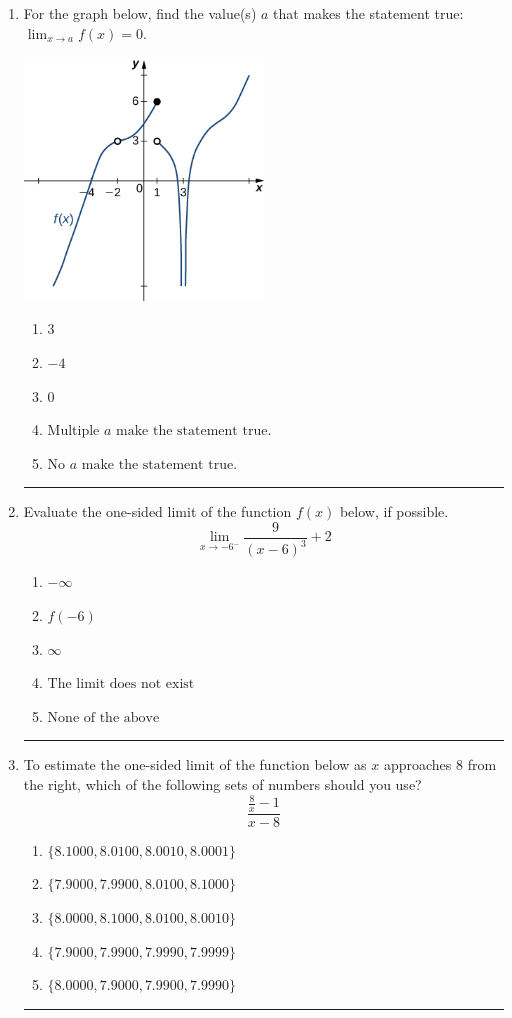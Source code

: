 \documentclass[14pt]{extbook}
\newcommand{\litem}[1]{\item#1\hspace*{-1cm}\rule{\textwidth}{0.4pt}}
\begin{document}
\begin{enumerate}
{\begin{enumerate}[label=\Alph*.]
\end{enumerate} }
\litem{
For the graph below, find the value(s) $a$ that makes the statement true: $ \displaystyle \lim_{x \rightarrow a} f(x) = 0$.
\begin{center}
    \includegraphics[width=0.5\textwidth]{../Figures/evaluateLimitGraphicallyA.png}
\end{center}
\begin{enumerate}[label=\Alph*.]
\item \( 3 \)
\item \( -4 \)
\item \( 0 \)
\item \( \text{Multiple } a \text{ make the statement true}. \)
\item \( \text{No } a \text{ make the statement true}. \)

\end{enumerate} }
\litem{
Evaluate the one-sided limit of the function $f(x)$ below, if possible.\[ \lim_{x \rightarrow -6^-} \frac{9}{(x-6)^3}+2 \]\begin{enumerate}[label=\Alph*.]
\item \( -\infty \)
\item \( f(-6) \)
\item \( \infty \)
\item \( \text{The limit does not exist} \)
\item \( \text{None of the above} \)

\end{enumerate} }
\litem{
To estimate the one-sided limit of the function below as $x$ approaches 8 from the right, which of the following sets of numbers should you use?\[ \frac{\frac{8}{x} - 1}{x - 8} \]\begin{enumerate}[label=\Alph*.]
\item \( \{ 8.1000, 8.0100, 8.0010, 8.0001 \} \)
\item \( \{ 7.9000, 7.9900, 8.0100, 8.1000 \} \)
\item \( \{ 8.0000, 8.1000, 8.0100, 8.0010 \} \)
\item \( \{ 7.9000, 7.9900, 7.9990, 7.9999 \} \)
\item \( \{ 8.0000, 7.9000, 7.9900, 7.9990 \} \)


\end{enumerate}}
\end{enumerate}
\end{document}
